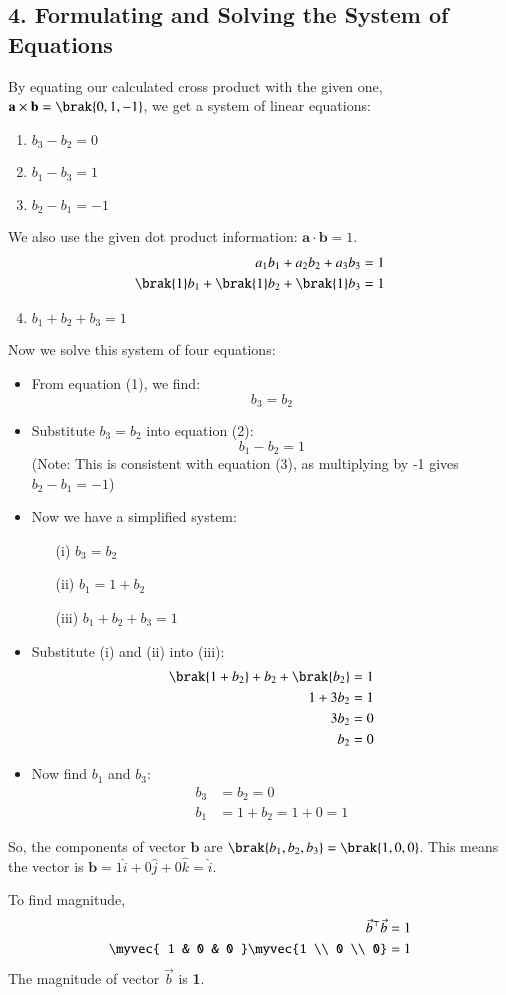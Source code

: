 \documentclass[journal]{IEEEtran}
\numberwithin{equation}{enumi}
\numberwithin{figure}{enumi}
\begin{document}
\subsection*{4. Formulating and Solving the System of Equations}
By equating our calculated cross product with the given one, $\mathbf{a} \times \mathbf{b} = \brak{0, 1, -1}$, we get a system of linear equations:
\begin{enumerate}
	\item $b_3 - b_2 = 0$
	\item $b_1 - b_3 = 1$
	\item $b_2 - b_1 = -1$
\end{enumerate}
We also use the given dot product information: $\mathbf{a} \cdot \mathbf{b} = 1$.
\begin{align*}
	a_1b_1 + a_2b_2 + a_3b_3 &= 1 \\
	\brak{1}b_1 + \brak{1}b_2 + \brak{1}b_3 &= 1 \\
\end{align*}
\begin{enumerate}
	\setcounter{enumi}{3}
	\item $b_1 + b_2 + b_3 = 1$
\end{enumerate}
Now we solve this system of four equations:
\begin{itemize}
	\item From equation (1), we find:
	\[ b_3 = b_2 \]
	\item Substitute $b_3 = b_2$ into equation (2):
	\[ b_1 - b_2 = 1 \]
	(Note: This is consistent with equation (3), as multiplying by -1 gives $b_2 - b_1 = -1$)
	\item Now we have a simplified system:
	\begin{itemize}
		\item[(i)] $b_3 = b_2$
		\item[(ii)] $b_1 = 1 + b_2$
		\item[(iii)] $b_1 + b_2 + b_3 = 1$
	\end{itemize}
	\item Substitute (i) and (ii) into (iii):
	\begin{align*}
		\brak{1 + b_2} + b_2 + \brak{b_2} &= 1 \\
		1 + 3b_2 &= 1 \\
		3b_2 &= 0 \\
		b_2 &= 0
	\end{align*}
	\item Now find $b_1$ and $b_3$:
	\begin{align*}
		b_3 &= b_2 = 0 \\
		b_1 &= 1 + b_2 = 1 + 0 = 1
	\end{align*}
\end{itemize}
So, the components of vector $\mathbf{b}$ are $\brak{b_1, b_2, b_3} = \brak{1, 0, 0}$. This means the vector is $\mathbf{b} = 1\hat{i} + 0\hat{j} + 0\hat{k} = \hat{i}$.

To find magnitude,
\begin{align}
	\vec{b}^\top \vec{b} = 1 \\
	\myvec{ 1 & 0 & 0 } \myvec{1 \\ 0 \\ 0} = 1
\end{align}
The magnitude of vector $\vec{b}$ is \textbf{1}.

		
\end{document}
